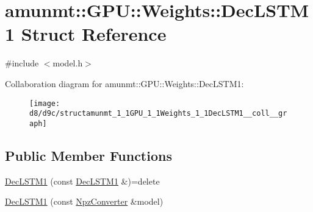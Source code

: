 \hypertarget{structamunmt_1_1GPU_1_1Weights_1_1DecLSTM1}{}\section{amunmt\+:\+:G\+PU\+:\+:Weights\+:\+:Dec\+L\+S\+T\+M1 Struct Reference}
\label{structamunmt_1_1GPU_1_1Weights_1_1DecLSTM1}


{\ttfamily \#include $<$model.\+h$>$}



Collaboration diagram for amunmt\+:\+:G\+PU\+:\+:Weights\+:\+:Dec\+L\+S\+T\+M1\+:
\nopagebreak
\begin{figure}[H]
\begin{center}
\leavevmode
\texttt{[image: d8/d9c/structamunmt\_1\_1GPU\_1\_1Weights\_1\_1DecLSTM1\_\_coll\_\_graph]}
\end{center}
\end{figure}
\subsection*{Public Member Functions}
\begin{DoxyCompactItemize}
\item 
\hyperlink{structamunmt_1_1GPU_1_1Weights_1_1DecLSTM1_a5ec11d8cdf6ec6d046abee68090b2d49}{Dec\+L\+S\+T\+M1} (const \hyperlink{structamunmt_1_1GPU_1_1Weights_1_1DecLSTM1}{Dec\+L\+S\+T\+M1} \&)=delete
\item 
\hyperlink{structamunmt_1_1GPU_1_1Weights_1_1DecLSTM1_a3726af9af3abc9e12fac1c3330161b03}{Dec\+L\+S\+T\+M1} (const \hyperlink{classamunmt_1_1GPU_1_1NpzConverter}{Npz\+Converter} \&model)
\end{DoxyCompactItemize}
